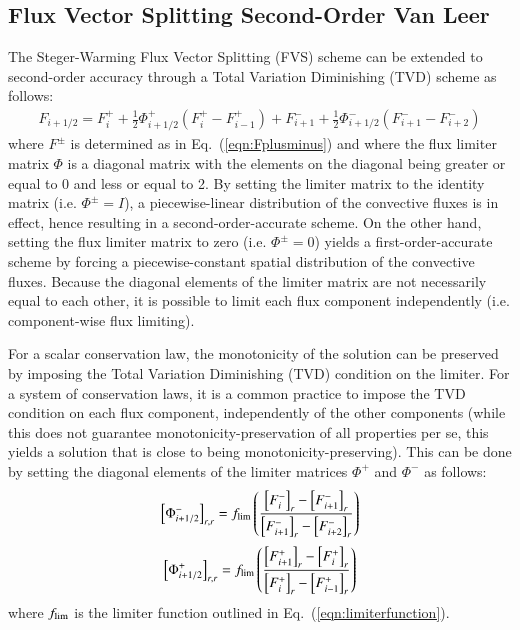 \documentclass{warpdoc}
\newcommand{\mfd}{\displaystyle}
\begin{document}
\subsection{Flux Vector Splitting Second-Order Van Leer}


The Steger-Warming Flux Vector Splitting (FVS) scheme \cite{jcp:1981:steger} can be extended to second-order accuracy through a Total Variation Diminishing (TVD) scheme as follows:
%
\begin{equation}
\begin{array}{r}
\mfd
F_{i+1/2}=
  F_i^+ 
+\frac{1}{2} \Phi^+_{i+1/2} \left(  F_i^+  -  F_{i-1}^+\right)  
+F_{i+1}^-
+\frac{1}{2} \Phi^-_{i+1/2} \left( F_{i+1}^- -  F_{i+2}^-\right) 
\end{array}
\label{eqn:FVS_2o}
\end{equation}
%
where $F^\pm$ is determined as in Eq.\ (\ref{eqn:Fplusminus}) and where the flux limiter matrix $\Phi$ is a diagonal matrix with the elements on the diagonal being greater or equal to 0 and less or equal to 2.  By setting the limiter matrix to the identity matrix (i.e. $\Phi^\pm=I$), a piecewise-linear distribution of the convective fluxes is in effect, hence resulting in a second-order-accurate scheme. On the other hand, setting  the flux limiter matrix to zero (i.e. $\Phi^\pm=0$) yields a first-order-accurate scheme by forcing a piecewise-constant spatial distribution of the convective fluxes. Because the diagonal elements of the limiter matrix are not necessarily equal to each other, it is possible to limit each flux component independently (i.e. component-wise flux limiting). 

For a scalar conservation law, the monotonicity of the solution can be preserved by imposing the Total Variation Diminishing (TVD) condition on the limiter. For a system of conservation laws, it is a common practice to impose the TVD condition on each flux component, independently of the other components (while this does not guarantee monotonicity-preservation of all properties per se, this yields a solution that is close to being monotonicity-preserving). This can be done by setting the diagonal elements of the limiter matrices $\Phi^+$ and $\Phi^-$ as follows: 
%
\begin{equation}
\left[\Phi_{i+1/2}^-\right]_{r,r} =  {f_{\rm lim}}\left(\mfd\frac{\left[F_{i}^-\right]_r -\left[F_{i+1}^-\right]_r}{\left[F_{i+1}^-\right]_r-\left[F_{i+2}^-\right]_r}  \right) 
\label{eqn:psiminus}
\end{equation}
%
\begin{equation}
\left[\Phi_{i+1/2}^+\right]_{r,r} =  {f_{\rm lim}}\left(\mfd\frac{\left[F_{i+1}^+\right]_r -\left[F_{i}^+\right]_r}{\left[F_{i}^+\right]_r-\left[F_{i-1}^+\right]_r}  \right)
\label{eqn:psiplus}
\end{equation}
%
%
where $f_{\rm lim}$ is the limiter function outlined in Eq.\ (\ref{eqn:limiterfunction}). 
\end{document}

